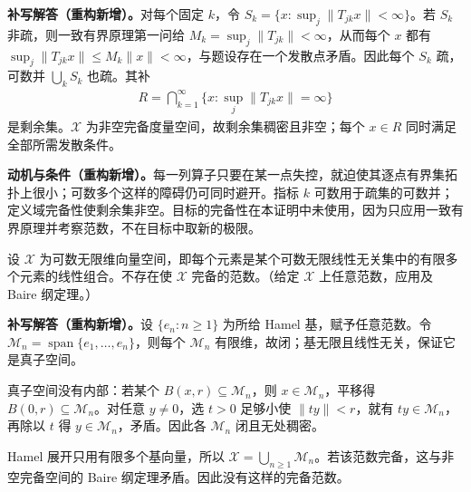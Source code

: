 \documentclass[../../main.tex]{subfiles}
\begin{document}
\begin{solution}
\textbf{补写解答（重构新增）。}对每个固定 $k$，令 $S_k=\{x:\sup_j\|T_{jk}x\|<\infty\}$。若 $S_k$ 非疏，则一致有界原理第一问给 $M_k=\sup_j\|T_{jk}\|<\infty$，从而每个 $x$ 都有 $\sup_j\|T_{jk}x\|\le M_k\|x\|<\infty$，与题设存在一个发散点矛盾。因此每个 $S_k$ 疏，可数并 $\bigcup_kS_k$ 也疏。其补
\begin{align*}
R=\bigcap_{k=1}^{\infty}\{x:\sup_j\|T_{jk}x\|=\infty\}
\end{align*}
是剩余集。$\mathcal X$ 为非空完备度量空间，故剩余集稠密且非空；每个 $x\in R$ 同时满足全部所需发散条件。
\end{solution}
\begin{remark}
\textbf{动机与条件（重构新增）。}每一列算子只要在某一点失控，就迫使其逐点有界集拓扑上很小；可数多个这样的障碍仍可同时避开。指标 $k$ 可数用于疏集的可数并；定义域完备性使剩余集非空。目标的完备性在本证明中未使用，因为只应用一致有界原理并考察范数，不在目标中取新的极限。
\end{remark}
\begin{exercise}\label{exercise:ch05-countable-hamel-dimension}
设 $\mathcal X$ 为可数无限维向量空间，即每个元素是某个可数无限线性无关集中的有限多个元素的线性组合。不存在使 $\mathcal X$ 完备的范数。（给定 $\mathcal X$ 上任意范数，应用及 Baire 纲定理。）
\end{exercise}
\begin{solution}
\textbf{补写解答（重构新增）。}设 $\{e_n:n\ge1\}$ 为所给 Hamel 基，赋予任意范数。令 $\mathcal M_n=\operatorname{span}\{e_1,\ldots,e_n\}$，则每个 $\mathcal M_n$ 有限维，故闭；基无限且线性无关，保证它是真子空间。

真子空间没有内部：若某个 $B(x,r)\subseteq\mathcal M_n$，则 $x\in\mathcal M_n$，平移得 $B(0,r)\subseteq\mathcal M_n$。对任意 $y\ne0$，选 $t>0$ 足够小使 $\|ty\|<r$，就有 $ty\in\mathcal M_n$，再除以 $t$ 得 $y\in\mathcal M_n$，矛盾。因此各 $\mathcal M_n$ 闭且无处稠密。

Hamel 展开只用有限多个基向量，所以 $\mathcal X=\bigcup_{n\ge1}\mathcal M_n$。若该范数完备，这与非空完备空间的 Baire 纲定理矛盾。因此没有这样的完备范数。
\end{solution}
\end{document}
